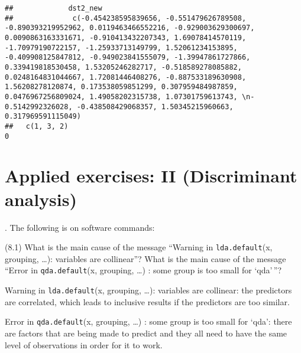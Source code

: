 \documentclass[
  11pt,
]{article}
\begin{document}
\begin{verbatim}
##             dst2_new
##              c(-0.454238595839656, -0.551479626789508, -0.890393219952962, 0.0119463466552216, -0.929003629300697, 0.0090863163331671, -0.910413432207343, 1.69078414570119, -1.70979190722157, -1.25933713149799, 1.52061234153895, -0.409908125847812, -0.949023841555079, -1.39947861727866, 0.339419818530458, 1.53205246282717, -0.518589278085882, 0.0248164831044667, 1.72081446408276, -0.887533189630908, 1.56208278120874, 0.173538059851299, 0.307959484987859, 0.0476967256809024, 1.49058202315738, 1.07301759613743, \n-0.5142992326028, -0.438508429068357, 1.50345215960663, 0.317969591115049)
##   c(1, 3, 2)                                                                                                                                                                                                                                                                                                                                                                                                                                                                                                                                                                                                  0
\end{verbatim}

\hypertarget{applied-exercises-ii-discriminant-analysis}{%
\section{Applied exercises: II (Discriminant
analysis)}\label{applied-exercises-ii-discriminant-analysis}}

. The following is on software commands:

(8.1) What is the main cause of the message ``Warning in
\texttt{lda.default}(x, grouping, \ldots): variables are collinear''?
What is the main cause of the message ``Error in \texttt{qda.default}(x,
grouping, \ldots) : some group is too small for `qda'\,''?

Warning in \texttt{lda.default}(x, grouping, \ldots): variables are
collinear: the predictors are correlated, which leads to inclusive
results if the predictors are too similar.

Error in \texttt{qda.default}(x, grouping, \ldots) : some group is too
small for `qda': there are factors that are being made to predict and
they all need to have the same level of observations in order for it to
work.
\end{document}
